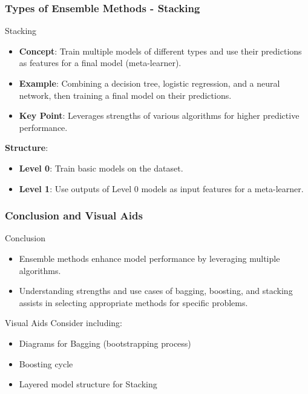 \documentclass[aspectratio=169]{beamer}
\begin{document}
\begin{frame}[fragile]
    \frametitle{Types of Ensemble Methods - Stacking}
    \begin{block}{Stacking}
        \begin{itemize}
            \item \textbf{Concept}: Train multiple models of different types and use their predictions as features for a final model (meta-learner).
            \item \textbf{Example}: Combining a decision tree, logistic regression, and a neural network, then training a final model on their predictions.
            \item \textbf{Key Point}: Leverages strengths of various algorithms for higher predictive performance.
        \end{itemize}

        \textbf{Structure}:
        \begin{itemize}
            \item \textbf{Level 0}: Train basic models on the dataset.
            \item \textbf{Level 1}: Use outputs of Level 0 models as input features for a meta-learner.
        \end{itemize}
    \end{block}
\end{frame}

\begin{frame}[fragile]
    \frametitle{Conclusion and Visual Aids}
    \begin{block}{Conclusion}
        \begin{itemize}
            \item Ensemble methods enhance model performance by leveraging multiple algorithms.
            \item Understanding strengths and use cases of bagging, boosting, and stacking assists in selecting appropriate methods for specific problems.
        \end{itemize}
    \end{block}

    \begin{block}{Visual Aids}
        Consider including:
        \begin{itemize}
            \item Diagrams for Bagging (bootstrapping process)
            \item Boosting cycle
            \item Layered model structure for Stacking
        \end{itemize}
    \end{block}
\end{frame}
\end{document}
